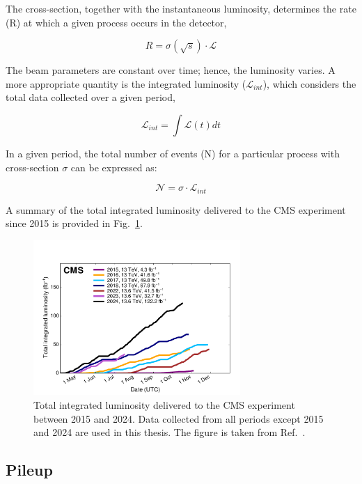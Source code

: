 The cross-section, together with the instantaneous luminosity, determines the rate (R) at which a given process occurs in the detector,

\begin{equation}
    R = \sigma(\sqrt{s}) \cdot \mathscr{L} 
\end{equation}

The beam parameters are constant over time; hence, the luminosity varies. A more appropriate quantity is the integrated luminosity ($\mathscr{L}_{int}$), which considers the total data collected over a given period,

\begin{equation}
    \mathscr{L}_{int} = \int \mathscr{L}(t) dt
\end{equation}

In a given period, the total number of events (N) for a particular process with cross-section $\sigma$ can be expressed as:

\begin{equation}
    \mathscr{N} = \sigma \cdot \mathscr{L}_{int}
\end{equation}

A summary of the total integrated luminosity delivered to the CMS experiment since 2015 is provided in Fig.~\ref{Figure:Chapter3_CMS_IntegratedLumi}.

\begin{figure}[h]
\centering
\includegraphics[width= 0.7\textwidth]{Figures/Chapter3/CMS_IntegratedLumi.pdf}
\caption{Total integrated luminosity delivered to the CMS experiment between 2015 and 2024. Data collected from all periods except 2015 and 2024 are used in this thesis. The figure is taken from Ref.~\cite{CMS_IntegratedLumi}.}
\label{Figure:Chapter3_CMS_IntegratedLumi}
\end{figure}

\subsection{Pileup}

